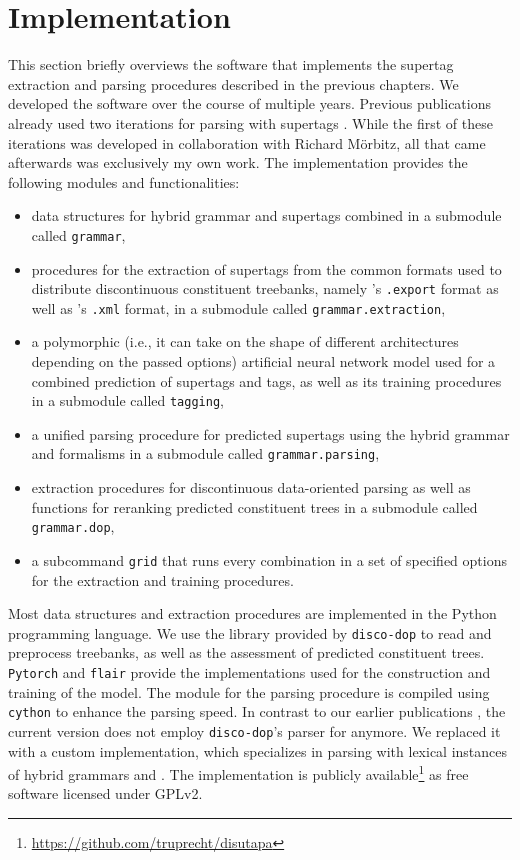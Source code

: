 \documentclass[../../document.tex]{subfiles}
\begin{document}
    \section{Implementation}\label{sec:implementation}
    This section briefly overviews the software that implements the supertag extraction and parsing procedures described in the previous chapters.
    We developed the software over the course of multiple years. Previous publications already used two iterations for parsing with  supertags \citep{RupMoe21,Rup22}.
    While the first of these iterations was developed in collaboration with Richard Mörbitz, all that came afterwards was exclusively my own work.
    The implementation provides the following modules and functionalities:
    \begin{itemize}
        \item data structures for hybrid grammar and  supertags combined in a submodule called \texttt{grammar},
        \item procedures for the extraction of supertags from the common formats used to distribute discontinuous constituent treebanks, namely \negra{}'s \texttt{.export} format as well as \tiger{}'s \texttt{.xml} format, in a submodule called \texttt{grammar.extraction},
        \item a polymorphic (i.e., it can take on the shape of different architectures depending on the passed options) artificial neural network model used for a combined prediction of supertags and  tags, as well as its training procedures in a submodule called \texttt{tagging},
        \item a unified parsing procedure for predicted supertags using the hybrid grammar and  formalisms in a submodule called \texttt{grammar.parsing},
        \item extraction procedures for discontinuous data-oriented parsing as well as functions for reranking predicted constituent trees in a submodule called \texttt{grammar.dop},
        \item a subcommand \texttt{grid} that runs every combination in a set of specified options for the extraction and training procedures.
    \end{itemize}

    Most data structures and extraction procedures are implemented in the Python programming language.
    We use the library provided by \texttt{disco-dop} \citep{Cra12} to read and preprocess treebanks, as well as the assessment of predicted constituent trees.
    \texttt{Pytorch} \citep{paszke2019pytorch} and \texttt{flair} \citep{Akb19} provide the implementations used for the construction and training of the  model.
    The module for the parsing procedure is compiled using \texttt{cython} \citep{behnel2011cython} to enhance the parsing speed.
    In contrast to our earlier publications \citep{RupMoe21,Rup22}, the current version does not employ \texttt{disco-dop}'s parser for  anymore.
    We replaced it with a custom implementation, which specializes in parsing with lexical instances of hybrid grammars and .
    The implementation is publicly available\footnote{\url{https://github.com/truprecht/disutapa}} as free software licensed under GPLv2.
\end{document}
